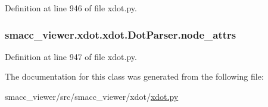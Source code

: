 Definition at line 946 of file xdot.\+py.

\subsubsection[{\texorpdfstring{node\+\_\+attrs}{node_attrs}}]{\setlength{\rightskip}{0pt plus 5cm}smacc\+\_\+viewer.\+xdot.\+xdot.\+Dot\+Parser.\+node\+\_\+attrs}\hypertarget{classsmacc__viewer_1_1xdot_1_1xdot_1_1DotParser_af0ebb95c9f287e9d0d6c57b1c29bd46b}{}\label{classsmacc__viewer_1_1xdot_1_1xdot_1_1DotParser_af0ebb95c9f287e9d0d6c57b1c29bd46b}


Definition at line 947 of file xdot.\+py.



The documentation for this class was generated from the following file\+:\begin{DoxyCompactItemize}
\item 
smacc\+\_\+viewer/src/smacc\+\_\+viewer/xdot/\hyperlink{xdot_8py}{xdot.\+py}\end{DoxyCompactItemize}
